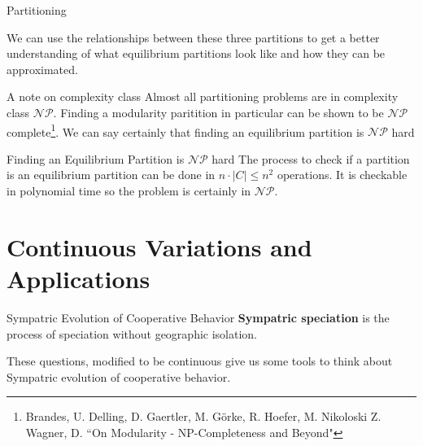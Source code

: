 \documentclass{beamer}
\begin{document}
\begin{frame}{Partitioning}
	\begin{figure}
			\centering
	\end{figure}
	We can use the relationships between these three partitions to get a better understanding of what equilibrium partitions look like and how they can be approximated. 
\end{frame}

\begin{frame}
	{A note on complexity class}
	Almost all partitioning problems are in complexity class $\mathcal{NP}$. Finding a modularity paritition in particular can be shown to be $\mathcal{NP}$ complete\footnote{Brandes, U. Delling, D. Gaertler, M. G\"orke, R. Hoefer, M. Nikoloski Z. Wagner, D. ``On Modularity - NP-Completeness and Beyond"}. We can say certainly that finding an equilibrium partition is $\mathcal{NP}$ hard
	\begin{block}{Finding an Equilibrium Partition is $\mathcal{NP}$ hard}
		The process to check if a partition is an equilibrium partition can be done in $n\cdot |C|\leq n^2$ operations. It is checkable in polynomial time so the problem is certainly in $\mathcal{NP}$. 
	\end{block}
\end{frame}
\section{Continuous Variations and Applications}
\begin{frame}{Sympatric Evolution of Cooperative Behavior}
	\textbf{Sympatric speciation} is the process of speciation without geographic isolation. 
	
	These questions, modified to be continuous give us some tools to think about Sympatric evolution of cooperative behavior. 
\end{frame}
\end{document}
